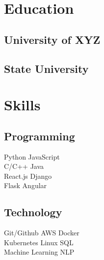 \documentclass[]{deedy-resume-multilatex}
\begin{document}
\hfill
\begin{minipage}[t]{0.33\textwidth}


\section{Education}

\subsection{University of XYZ}
\sectionsep

\subsection{State University}
\sectionsep


\section{Skills}
\subsection{Programming}
Python \textbullet{} JavaScript \\
C/C++ \textbullet{} Java \\
React.js \textbullet{} Django \\
Flask \textbullet{} Angular \\
\sectionsep

\subsection{Technology}
Git/Github \textbullet{} AWS \textbullet{} Docker \\
Kubernetes \textbullet{} Linux \textbullet{} SQL \\
Machine Learning \textbullet{} NLP \\
\sectionsep


\end{minipage}
\end{document}
